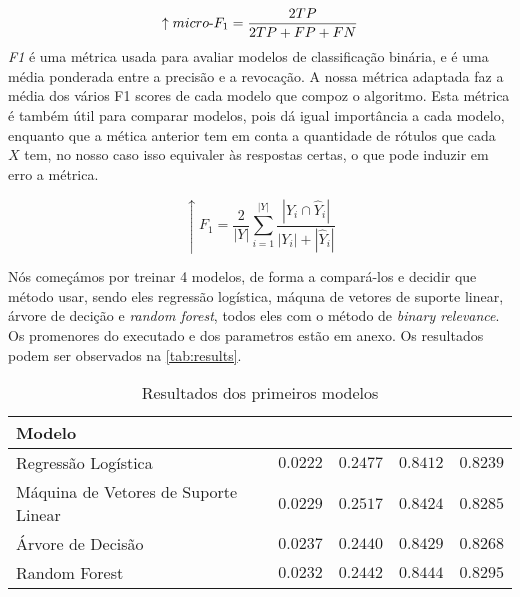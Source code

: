 \documentclass[justified, 11pt]{scrartcl}
\begin{document}
  $$
  \uparrow \mathnormal{micro\text{-}}F_1 = \frac{2 TP}{2TP + FP + FN}
  $$
  \textit{F1} é uma métrica usada para avaliar modelos de classificação binária, e é uma média ponderada entre a precisão e a revocação. A nossa métrica adaptada faz a média dos vários F1 scores de cada modelo que compoz o algoritmo. Esta métrica é também útil para comparar modelos, pois dá igual importância a cada modelo, enquanto que a mética anterior tem em conta a quantidade de rótulos que cada $X$ tem, no nosso caso isso equivaler às respostas certas, o que pode induzir em erro a métrica.

  $$
  \uparrow F_1 = \frac{2}{|Y|} \sum_{i=1}^{|Y|} 
    \frac{\left| Y_i \cap \hat{Y}_i \right|}{| Y_i | + | \hat{Y}_i |}
  $$

  
  Nós começámos por treinar 4 modelos, de forma a compará-los e decidir que método usar, sendo eles regressão logística, máquna de vetores de suporte linear, árvore de decição e \textit{random forest}, todos eles com o método de \textit{binary relevance}. Os promenores do executado e dos parametros estão em anexo. Os resultados podem ser observados na \autoref{tab:results}.
  \begin{table}[H]
    \centering
    \caption{Resultados dos primeiros modelos}
    \setlength{\extrarowheight}{0pt}
    \begin{tabulary}{\textwidth}{ L|r r r r }
      Modelo &  &  &  &  \\ \hline
      Regressão Logística & $0.0222$ & $0.2477$ & $0.8412$ & $0.8239$ \\
      Máquina de Vetores de Suporte Linear & $0.0229$ & $0.2517$ & $0.8424$ & $0.8285$ \\
      Árvore de Decisão & $\boldsymbol{0.0237}$ & $\boldsymbol{0.2440}$ & $0.8429$ & $0.8268$ \\
      Random Forest & $0.0232$ & $0.2442$ & $\boldsymbol{0.8444}$ & $\boldsymbol{0.8295}$ \\
    \end{tabulary}
    \label{tab:results}
  \end{table}
  
\end{document}
